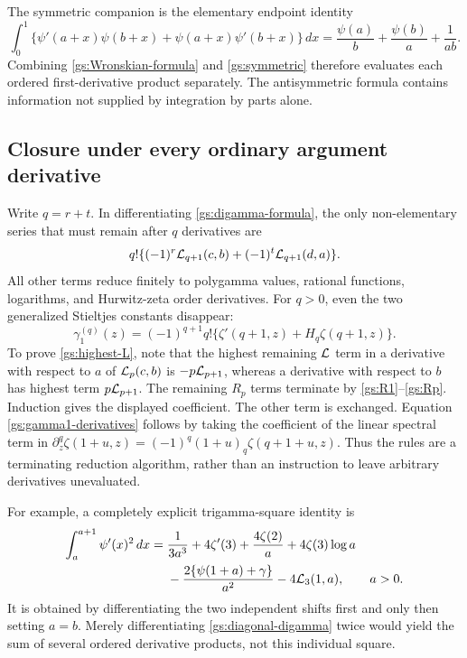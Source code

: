 \documentclass[11pt,letterpaper]{article}
\numberwithin{equation}{section}
\theoremstyle{definition}
\theoremstyle{remark}
\begin{document}
The symmetric companion is the elementary endpoint identity
\begin{equation}\label{gs:symmetric}
 \int_0^1
 \{\psi'(a+x)\psi(b+x)+\psi(a+x)\psi'(b+x)\}\,dx
 =\frac{\psi(a)}b+\frac{\psi(b)}a+\frac1{ab}.
\end{equation}
Combining \eqref{gs:Wronskian-formula} and \eqref{gs:symmetric}
therefore evaluates each ordered first-derivative product separately.
The antisymmetric formula contains information not supplied by
integration by parts alone.

\subsection{Closure under every ordinary argument derivative}

Write $q=r+t$.  In differentiating \eqref{gs:digamma-formula}, the
only non-elementary series that must remain after $q$ derivatives are
\begin{equation}\label{gs:highest-L}
 q!\{(-1)^r\mathcal L_{q+1}(c,b)+(-1)^t\mathcal L_{q+1}(d,a)\}.
\end{equation}
All other terms reduce finitely to polygamma values, rational
functions, logarithms, and Hurwitz-zeta order derivatives.  For
$q>0$, even the two generalized Stieltjes constants disappear:
\begin{equation}\label{gs:gamma1-derivatives}
 \gamma_1^{(q)}(z)=(-1)^{q+1}q!
        \{\zeta'(q+1,z)+H_q\zeta(q+1,z)\}.
\end{equation}
To prove \eqref{gs:highest-L}, note that the highest remaining
$\mathcal L$ term in a derivative with respect to $a$ of $\mathcal L_p(c,b)$
is $-p\mathcal L_{p+1}$, whereas a derivative with respect to $b$ has
highest term $p\mathcal L_{p+1}$.  The remaining $R_p$ terms terminate
by \eqref{gs:R1}--\eqref{gs:Rp}.  Induction gives the displayed
coefficient.  The other term is exchanged.  Equation
\eqref{gs:gamma1-derivatives} follows by taking the coefficient of
the linear spectral term in
$\partial_z^q\zeta(1+u,z)=(-1)^q(1+u)_q\zeta(q+1+u,z)$.
Thus the rules are a terminating reduction algorithm, rather than an
instruction to leave arbitrary derivatives unevaluated.

For example, a completely explicit trigamma-square identity is
\begin{align}
 \int_a^{a+1}\psi'(x)^2\,dx
 ={}&\frac1{3a^3}+4\zeta'(3)+\frac{4\zeta(2)}a
        +4\zeta(3)\log a\notag\\
 &-\frac{2\{\psi(1+a)+\gamma\}}{a^2}
        -4\mathcal L_3(1,a),\qquad a>0.
 \label{gs:trigamma-square}
\end{align}
It is obtained by differentiating the two independent shifts first
and only then setting $a=b$.  Merely differentiating
\eqref{gs:diagonal-digamma} twice would yield the sum of several
ordered derivative products, not this individual square.
\end{document}
